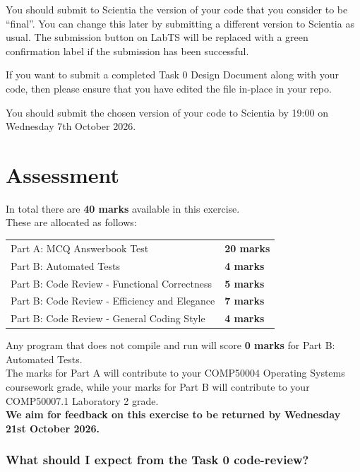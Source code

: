 \documentclass[a4paper,11pt]{article}
\begin{document}
You should submit to Scientia the version of your code that you consider to be ``final''.
You can change this later by submitting a different version to Scientia as usual.
The submission button on LabTS will be replaced with a green confirmation label if the submission has been successful.

If you want to submit a completed Task 0 Design Document along with your code, then please ensure that you have edited the  file in-place in your repo.

You should submit the chosen version of your code to Scientia by 19:00 on Wednesday 7th October 2026.


\section*{Assessment}
In total there are {\bf 40 marks} available in this exercise.\\
These are allocated as follows:
%
\begin{center}
\begin{tabular}{l@{\qquad\qquad}l}
  Part A: MCQ Answerbook Test                   & {\bf 20 marks} \\
  Part B: Automated Tests                       & {\bf 4 marks} \\
  Part B: Code Review - Functional Correctness  & {\bf 5 marks} \\
  Part B: Code Review - Efficiency and Elegance & {\bf 7 marks} \\
  Part B: Code Review - General Coding Style    & {\bf 4 marks} \\
\end{tabular}
\end{center}
%
Any program that does not compile and run will score {\bf 0 marks} for Part B: Automated Tests.\\[-0.8em]

\noindent The marks for Part A will contribute to your COMP50004 Operating Systems coursework grade,
while your marks for Part B will contribute to your COMP50007.1 Laboratory 2 grade.\\

\noindent \textbf{We aim for feedback on this exercise to be returned by Wednesday 21st October 2026.}

\subsubsection*{What should I expect from the Task 0 code-review?}
\end{document}
